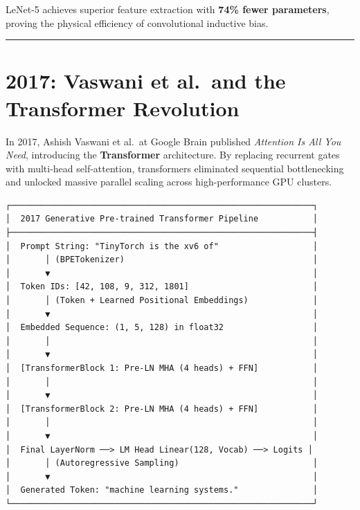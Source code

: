 \documentclass[
  letterpaper,
]{scrbook}
\begin{document}
LeNet-5 achieves superior feature extraction with \textbf{74\% fewer
parameters}, proving the physical efficiency of convolutional inductive
bias.

\begin{center}\rule{0.5\linewidth}{0.5pt}\end{center}

\section*{2017: Vaswani et al.~and the Transformer
Revolution}\label{vaswani-et-al.-and-the-transformer-revolution}


In 2017, Ashish Vaswani et al.~at Google Brain published \emph{Attention
Is All You Need}, introducing the \textbf{Transformer} architecture. By
replacing recurrent gates with multi-head self-attention, transformers
eliminated sequential bottlenecking and unlocked massive parallel
scaling across high-performance GPU clusters.

\begin{verbatim}
┌─────────────────────────────────────────────────────────────┐
│  2017 Generative Pre-trained Transformer Pipeline           │
├─────────────────────────────────────────────────────────────┤
│  Prompt String: "TinyTorch is the xv6 of"                   │
│       │ (BPETokenizer)                                      │
│       ▼                                                     │
│  Token IDs: [42, 108, 9, 312, 1801]                         │
│       │ (Token + Learned Positional Embeddings)             │
│       ▼                                                     │
│  Embedded Sequence: (1, 5, 128) in float32                  │
│       │                                                     │
│       ▼                                                     │
│  [TransformerBlock 1: Pre-LN MHA (4 heads) + FFN]           │
│       │                                                     │
│       ▼                                                     │
│  [TransformerBlock 2: Pre-LN MHA (4 heads) + FFN]           │
│       │                                                     │
│       ▼                                                     │
│  Final LayerNorm ──> LM Head Linear(128, Vocab) ──> Logits │
│       │ (Autoregressive Sampling)                           │
│       ▼                                                     │
│  Generated Token: "machine learning systems."               │
└─────────────────────────────────────────────────────────────┘
\end{verbatim}
\end{document}
